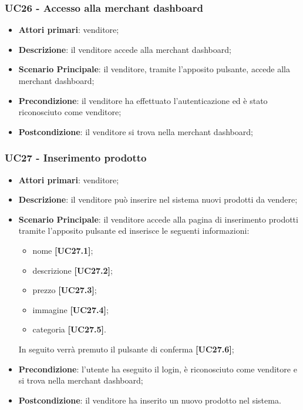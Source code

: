 \subsubsection{UC26 - Accesso alla merchant dashboard}
\begin{itemize}
\item \textbf{Attori primari}: venditore;
\item \textbf{Descrizione}: il venditore accede alla merchant dashboard;
\item \textbf{Scenario Principale}: il venditore, tramite l'apposito pulsante, accede alla merchant dashboard;
\item \textbf{Precondizione}: il venditore ha effettuato l'autenticazione ed è stato riconosciuto come venditore;
\item \textbf{Postcondizione}: il venditore si trova nella merchant dashboard;
\end{itemize}

\subsubsection{UC27 - Inserimento prodotto}
\begin{itemize}
\item \textbf{Attori primari}: venditore;
\item \textbf{Descrizione}: il venditore può inserire nel sistema nuovi prodotti da vendere;
\item \textbf{Scenario Principale}: il venditore accede alla pagina di inserimento prodotti tramite l'apposito pulsante ed inserisce le seguenti informazioni:
\begin{itemize}
	\item nome \textbf{[UC27.1]};
	\item descrizione \textbf{[UC27.2]};
	\item prezzo \textbf{[UC27.3]};
	\item immagine \textbf{[UC27.4]};
	\item categoria \textbf{[UC27.5]}.
\end{itemize}
In seguito verrà premuto il pulsante di conferma \textbf{[UC27.6]};
\item \textbf{Precondizione}: l'utente ha eseguito il login, è riconosciuto come venditore e si trova nella merchant dashboard;
\item \textbf{Postcondizione}: il venditore ha inserito un nuovo prodotto nel sistema.
\end{itemize}

